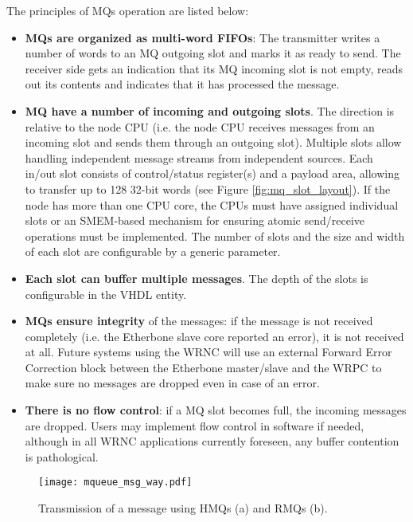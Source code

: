 \documentclass{article}
\begin{document}
The principles of MQs operation are listed below:
\begin{itemize}
\item \textbf{MQs are organized as multi-word FIFOs}: The transmitter writes a number of words to an MQ outgoing slot and marks it as ready to send. The receiver side gets an indication that its MQ incoming slot is not empty, reads out its contents and indicates that it has processed the message.
\item \textbf{MQ have a number of incoming and outgoing slots}. The direction is relative to the node CPU (i.e. the node CPU receives messages from an incoming slot and sends them through an outgoing slot). Multiple slots allow handling independent message streams from independent sources. Each in/out slot consists of control/status register(s) and a payload area, allowing to transfer up to 128 32-bit words (see Figure \ref{fig:mq_slot_layout}). If the node has more than one CPU core, the CPUs must have assigned individual slots or an SMEM-based mechanism for ensuring atomic send/receive operations must be implemented. The number of slots and the size and width of each slot are configurable by a generic parameter. 
\item \textbf{Each slot can buffer multiple messages}. The depth of the slots is configurable in the VHDL entity.
\item \textbf{MQs ensure integrity} of the messages: if the message is not received completely (i.e. the Etherbone slave core reported an error), it is not received at all. Future systems using the WRNC will use an external Forward Error Correction block between the Etherbone master/slave and the WRPC to make sure no messages are dropped even in case of an error.
\item \textbf{There is no flow control}: if a MQ slot becomes full, the incoming messages are dropped. Users may implement flow control in software if needed, although in all WRNC applications currently foreseen, any buffer contention is pathological. 

\end{itemize}

\begin{figure}[htb]
\centering
\texttt{[image: mqueue\_msg\_way.pdf]}
\caption{Transmission of a message using HMQs (a) and RMQs (b).}
\label{fig:mqueue_msg_way}
\end{figure}
\end{document}
